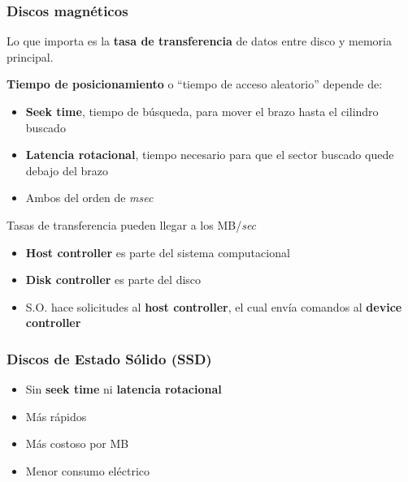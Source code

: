 \documentclass[letter]{beamer}
\begin{document}
\begin{frame}
  \frametitle{Discos magnéticos}
  
  Lo que importa es la {\bf tasa de transferencia} de datos entre
  disco y memoria principal.

  {\bf Tiempo de posicionamiento} o ``tiempo de acceso aleatorio''
  depende de:
  \begin{itemize}
    \item {\bf Seek time}, tiempo de búsqueda, para mover el brazo hasta el cilindro buscado
    \item {\bf Latencia rotacional}, tiempo necesario para que el sector buscado quede debajo del brazo
    \item Ambos del orden de {\em msec}
  \end{itemize}
  Tasas de transferencia pueden llegar a los MB/{\em sec}
  
  \begin{itemize}
    \item {\bf Host controller} es parte del sistema computacional
    \item {\bf Disk controller} es parte del disco
    \item S.O. hace solicitudes al {\bf host controller}, el cual envía comandos al {\bf device controller}
  \end{itemize}

\end{frame}
\begin{frame}
  \frametitle{Discos de Estado Sólido (SSD)}

  \begin{itemize}
    \item Sin {\bf seek time} ni {\bf latencia rotacional}
    \item Más rápidos
    \item Más costoso por MB
    \item Menor consumo eléctrico
  \end{itemize}
\end{frame}
\end{document}
